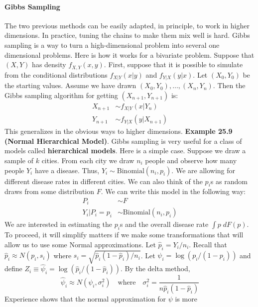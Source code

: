 \paragraph{Gibbs Sampling}\label{gibbs-sampling}
The two previous methods can be easily adapted, in principle, to work in
higher dimensions. In practice, tuning the chains to make them mix well
is hard. Gibbs sampling is a way to turn a high-dimensional problem into
several one dimensional problems.
Here is how it works for a bivariate problem. Suppose that \((X, Y)\) has
density \(f_{X, Y}(x, y)\). First, suppose that it is possible to
simulate from the conditional distributions \(f_{X|Y}(x | y)\) and
\(f_{Y | X}(y | x)\). Let \((X_{0}, Y_{0})\) be the starting values. Assume
we have drawn \((X_{0}, Y_{0}), \dots, (X_{n}, Y_{n})\). Then the Gibbs sampling
algorithm for getting \((X_{n+1}, Y_{n+1})\) is:
\begin{align*}
X_{n + 1} &\sim f_{X|Y}(x | Y_{n}) \\
Y_{n + 1} &\sim f_{Y|X}(y | X_{n + 1})
\end{align*}
This generalizes in the obvious ways to higher dimensions.
\textbf{Example 25.9 (Normal Hierarchical Model)}. Gibbs sampling is
very useful for a class of models called \textbf{hierarchical models}.
Here is a simple case. Suppose we draw a sample of \(k\) cities. From
each city we draw \(n_{i}\) people and observe how many people \(Y_{i}\)
have a disease. Thus, \(Y_{i} \sim \text{Binomial}(n_{i}, p_{i})\). We are
allowing for different disease rates in different cities. We can also
think of the \(p_{i}\)s as random draws from some distribution \(F\). We
can write this model in the following way:
\begin{align*}
P_{i} &\sim F \\
Y_{i} | P_{i} = p_{i} &\sim \text{Binomial}(n_{i}, p_{i})
\end{align*}
We are interested in estimating the \(p_{i}\)s and the overall disease
rate \(\int p \; dF(p)\).
To proceed, it will simplify matters if we make some transformations
that will allow us to use some Normal approximations. Let
\(\hat{p}_{i} = Y_{i} / n_{i}\). Recall that \(\hat{p}_{i} \approx N(p_{i}, s_{i})\)
where \(s_{i} = \sqrt{\hat{p}_{i} (1 - \hat{p}_{i}) / n_{i}}\). Let
\(\psi_{i} = \log (p_{i} / (1 - p_{i}))\) and define
\(Z_{i} \equiv \hat{\psi}_{i} = \log (\hat{p}_{i} / (1 - \hat{p}_{i}))\). By the
delta method,
\[
\hat{\psi}_{i} \approx N(\psi_{i}, \sigma_{i}^{2}) \quad \text{where} \quad \sigma_{i}^{2} = \frac{1}{n \hat{p}_{i} (1 - \hat{p}_{i})}
\]
Experience shows that the normal approximation for \(\psi\) is more
